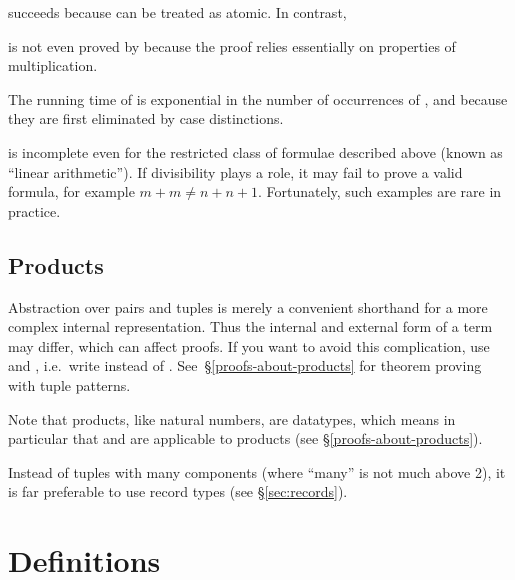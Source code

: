 %
succeeds because  can be treated as atomic.
In contrast,

%
is not even proved by  because the proof relies essentially
on properties of multiplication.

\begin{warn}
  The running time of  is exponential in the number of occurrences
  of ,  and
   because they are first eliminated by case distinctions.

   is incomplete even for the restricted class of formulae
  described above (known as ``linear arithmetic''). If divisibility plays a
  role, it may fail to prove a valid formula, for example $m+m \neq n+n+1$.
  Fortunately, such examples are rare in practice.
\end{warn}



\subsection{Products}


\begin{warn}
  Abstraction over pairs and tuples is merely a convenient shorthand for a
  more complex internal representation.  Thus the internal and external form
  of a term may differ, which can affect proofs. If you want to avoid this
  complication, use  and , i.e.\ write
   instead of
  .  See~\S\ref{proofs-about-products} for
  theorem proving with tuple patterns.
\end{warn}

Note that products, like natural numbers, are datatypes, which means
in particular that  and  are applicable to
products (see \S\ref{proofs-about-products}).

Instead of tuples with many components (where ``many'' is not much above 2),
it is far preferable to use record types (see \S\ref{sec:records}).

\section{Definitions}
\label{sec:Definitions}

